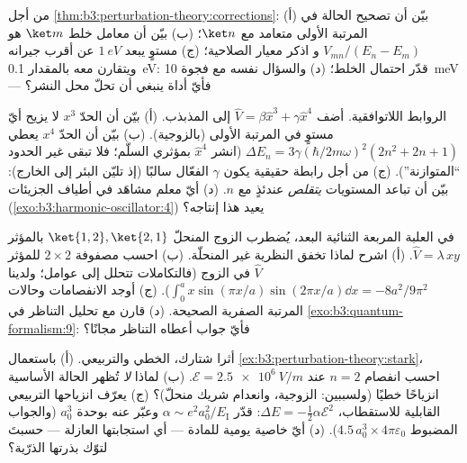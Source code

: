 \begin{exercise}[$\star$]\label{exo:b3:perturbation-theory:4}
من أجل \cref{thm:b3:perturbation-theory:corrections}: (أ) بيّن أن
تصحيح الحالة في المرتبة الأولى متعامد مع $\ket n$؛ (ب) بيّن أن
معامل خلط $\ket m$ هو $V_{mn}/(E_n - E_m)$ و
اذكر معيار الصلاحية؛ (ج) مستوٍ يبعد $\qty{1}{eV}$ عن
أقرب جيرانه ويتقارن معه بالمقدار \qty{0.1}{eV}: قدّر
احتمال الخلط؛ (د) والسؤال نفسه مع فجوة \qty{10}{meV} ---
فأيّ أداة ينبغي أن تحلّ محل النشر؟
\end{exercise}

\begin{exercise}[$\star\star$]\label{exo:b3:perturbation-theory:5}
الروابط اللاتوافقية. أضف $\hat V = \beta\hat x^3 + \gamma\hat x^4$ إلى
المذبذب. (أ) بيّن أن الحدّ $x^3$ لا يزيح أيّ مستوٍ في المرتبة
الأولى (بالزوجية). (ب) بيّن أن الحدّ $x^4$ يعطي $\Delta E_n =
3\gamma(\hbar/2m\omega)^2(2n^2 + 2n + 1)$ (انشر $\hat x^4$ بمؤثري
السلّم؛ فلا تبقى غير الحدود ``المتوازنة''). (ج) من أجل رابطة حقيقية يكون $\gamma$ الفعّال سالبًا (إذ
تليّن البئر إلى الخارج): بيّن أن تباعد المستويات \emph{يتقلص} عندئذٍ مع
$n$.
(د) أيّ معلم مشاهَد في أطياف الجزيئات
(\cref{exo:b3:harmonic-oscillator:4}) يعيد هذا إنتاجه؟
\end{exercise}

\begin{exercise}[$\star\star$]\label{exo:b3:perturbation-theory:6}
في العلبة المربعة الثنائية البعد، يُضطرب الزوج المنحلّ $\ket{1,2},
\ket{2,1}$ بالمؤثر $\hat V = \lambda\,xy$. (أ) اشرح لماذا
تخفق النظرية غير المنحلّة. (ب) احسب مصفوفة $2\times2$ للمؤثر
$\hat V$ في الزوج (فالتكاملات تتحلل إلى عوامل؛ ولدينا $\int_0^a
x\sin(\pi x/a)\sin(2\pi x/a)\dd x = -8a^2/9\pi^2$). (ج) أوجد
الانفصامات وحالات المرتبة الصفرية الصحيحة. (د) قارن مع
تحليل التناظر في \cref{exo:b3:quantum-formalism:9}: فأيّ
جواب أعطاه التناظر مجانًا؟
\end{exercise}

\begin{exercise}[$\star\star$]\label{exo:b3:perturbation-theory:7}
أثرا شتارك، الخطي والتربيعي. (أ) باستعمال
\cref{ex:b3:perturbation-theory:stark}، احسب انفصام $n = 2$
عند $\mathcal E = \qty{2.5e6}{V/m}$. (ب) لماذا \emph{لا} تُظهر
الحالة الأساسية انزياحًا خطيًا (ولسببين: الزوجية، وانعدام
شريك منحلّ)؟ (ج) يعرّف انزياحها التربيعي القابلية
للاستقطاب، $\Delta E = -\tfrac12\alpha\mathcal E^2$: قدّر
$\alpha \sim e^2a_0^2/E_{\text{I}}$ وعبّر عنه بوحدة
$a_0^3$ (والجواب المضبوط $4.5\,a_0^3 \times
4\pi\varepsilon_0$). (د) أيّ خاصية يومية للمادة ---
أي استجابتها العازلة --- حسبتَ لتوّك بذرتها الذرّية؟
\end{exercise}

